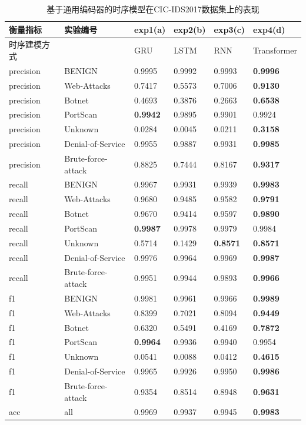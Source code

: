 \begin{table}[!ht]
    \centering
    \caption{基于通用编码器的时序模型在CIC-IDS2017数据集上的表现}
    \begin{adjustbox}{max width=.75\textwidth}
    \begin{tabular}{llllll}
    \toprule
        衡量指标 & 实验编号 & exp1(a) & exp2(b)  & exp3(c) & exp4(d)\\ \midrule
        时序建模方式 & ~ & GRU & LSTM & RNN  & Transformer  \\ 
        precision & BENIGN & 0.9995  & 0.9992  & 0.9993  & \textbf{0.9996} \\
        precision & Web-Attacks & 0.7417  & 0.5573  & 0.7006  & \textbf{0.9130} \\
        precision & Botnet & 0.4693  & 0.3876  & 0.2663  & \textbf{0.6538} \\
        precision & PortScan & \textbf{0.9942}  & 0.9895  & 0.9901  & 0.9924 \\
        precision & Unknown & 0.0284  & 0.0045  & 0.0211  & \textbf{0.3158} \\
        precision & Denial-of-Service & 0.9955  & 0.9887  & 0.9931  & \textbf{0.9985} \\
        precision & Brute-force-attack & 0.8825  & 0.7444  & 0.8167  & \textbf{0.9317} \\
        recall & BENIGN & 0.9967  & 0.9931  & 0.9939  & \textbf{0.9983} \\
        recall & Web-Attacks & 0.9680  & 0.9485  & 0.9582  & \textbf{0.9791} \\
        recall & Botnet & 0.9670  & 0.9414  & 0.9597  & \textbf{0.9890} \\
        recall & PortScan & \textbf{0.9987}  & 0.9978  & 0.9979  & 0.9984 \\
        recall & Unknown & 0.5714  & 0.1429  & \textbf{0.8571}  & \textbf{0.8571} \\
        recall & Denial-of-Service & 0.9976  & 0.9964  & 0.9969  & \textbf{0.9987} \\
        recall & Brute-force-attack & 0.9951  & 0.9944  & 0.9893  & \textbf{0.9966} \\
        f1 & BENIGN & 0.9981  & 0.9961  & 0.9966  & \textbf{0.9989} \\
        f1 & Web-Attacks & 0.8399  & 0.7021  & 0.8094  & \textbf{0.9449} \\
        f1 & Botnet & 0.6320  & 0.5491  & 0.4169  & \textbf{0.7872} \\
        f1 & PortScan & \textbf{0.9964}  & 0.9936  & 0.9940  & 0.9954 \\
        f1 & Unknown & 0.0541  & 0.0088  & 0.0412  & \textbf{0.4615} \\
        f1 & Denial-of-Service & 0.9965  & 0.9926  & 0.9950  & \textbf{0.9986} \\
        f1 & Brute-force-attack & 0.9354  & 0.8514  & 0.8948  & \textbf{0.9631} \\
        acc & all & 0.9969  & 0.9937  & 0.9945  & \textbf{0.9983} \\
    \bottomrule
    \end{tabular}
    \end{adjustbox}
    \label{tab:tr-seq}
\end{table}
